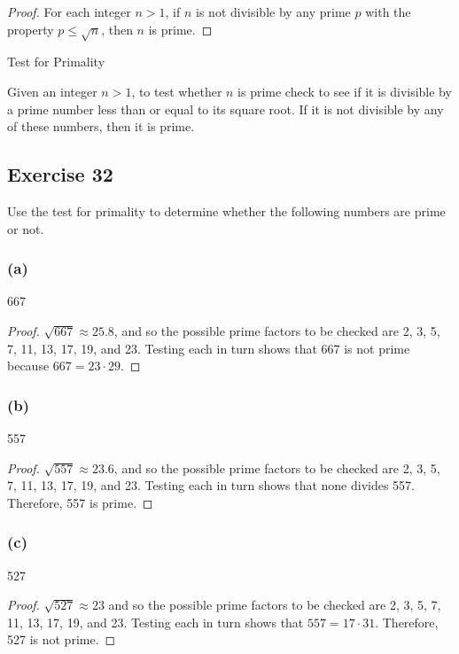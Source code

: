 \documentclass[14pt]{extarticle}
\newcommand{\cy}{\color{cyan}}
\begin{document}
\begin{proof}
    For each integer $n>1$, if $n$ is not divisible by any prime $p$ with the property $p \leq \sqrt{n}$, then $n$ is prime.
\end{proof}

\begin{tcolorbox}[colframe=cyan]
    \begin{center}
        {\cy Test for Primality}
    \end{center}
    Given an integer $n > 1$, to test whether $n$ is prime check to see if it is divisible by a prime number less than or equal to its square root. If it is not divisible by any of these numbers, then it is prime.
\end{tcolorbox}

\subsection{Exercise 32}
Use the test for primality to determine whether the following numbers are prime or not.

\subsubsection{(a)}
667

\begin{proof}
    $\sqrt{667} \approx 25.8$, and so the possible prime factors to be checked are 2, 3, 5, 7, 11, 13, 17, 19, and 23. Testing each in turn shows that 667 is not prime because $667 = 23 \cdot 29$.
\end{proof}

\subsubsection{(b)}
557

\begin{proof}
    $\sqrt{557} \approx 23.6$, and so the possible prime factors to be checked are 2, 3, 5, 7, 11, 13, 17, 19, and 23. Testing each in turn shows that none divides 557. Therefore, 557 is prime.
\end{proof}

\subsubsection{(c)}
527

\begin{proof}
    $\sqrt{527} \approx 23$ and so the possible prime factors to be checked are 2, 3, 5, 7, 11, 13, 17, 19, and 23. Testing each in turn shows that $557 = 17 \cdot 31$. Therefore, 527 is not prime.
\end{proof}
\end{document}
